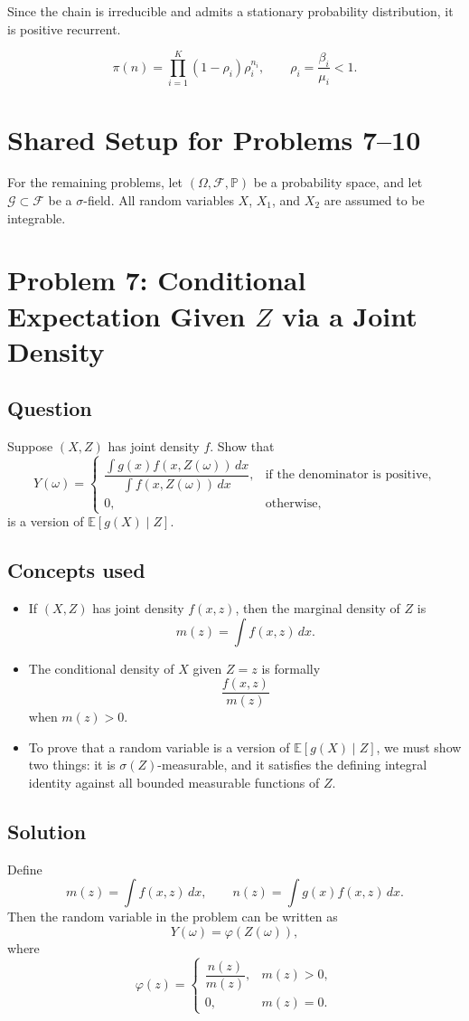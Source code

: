 \documentclass[11pt,a4paper]{article}
\newcommand{\E}{\mathbb{E}}
\newcommand{\1}{\mathbf{1}}
\begin{document}
Since the chain is irreducible and admits a stationary probability distribution, it is positive recurrent.

\[
\boxed{\pi(n)=\prod_{i=1}^K (1-\rho_i)\rho_i^{n_i},\qquad \rho_i=\frac{\beta_i}{\mu_i}<1.}
\]

\section*{Shared Setup for Problems 7--10}
For the remaining problems, let $(\Omega,\mathcal{F},\mathbb{P})$ be a probability space, and let $\mathcal{G}\subset \mathcal{F}$ be a $\sigma$-field. All random variables $X$, $X_1$, and $X_2$ are assumed to be integrable.

\section{Problem 7: Conditional Expectation Given \texorpdfstring{$Z$}{Z} via a Joint Density}
\subsection*{Question}
Suppose $(X,Z)$ has joint density $f$. Show that
\[
Y(\omega)=
\begin{cases}
\dfrac{\int g(x)f(x,Z(\omega))\,dx}{\int f(x,Z(\omega))\,dx}, & \text{if the denominator is positive},\\[2ex]
0, & \text{otherwise},
\end{cases}
\]
is a version of $\E[g(X)\mid Z]$.

\subsection*{Concepts used}
\begin{itemize}
  \item If $(X,Z)$ has joint density $f(x,z)$, then the marginal density of $Z$ is
  \[
  m(z)=\int f(x,z)\,dx.
  \]
  \item The conditional density of $X$ given $Z=z$ is formally
  \[
  \frac{f(x,z)}{m(z)}
  \]
  when $m(z)>0$.
  \item To prove that a random variable is a version of $\E[g(X)\mid Z]$, we must show two things:
  it is $\sigma(Z)$-measurable, and it satisfies the defining integral identity against all bounded measurable functions of $Z$.
\end{itemize}

\subsection*{Solution}
Define
\[
m(z)=\int f(x,z)\,dx,\qquad
n(z)=\int g(x)f(x,z)\,dx.
\]
Then the random variable in the problem can be written as
\[
Y(\omega)=\varphi(Z(\omega)),
\]
where
\[
\varphi(z)=
\begin{cases}
\dfrac{n(z)}{m(z)}, & m(z)>0,\\[1ex]
0, & m(z)=0.
\end{cases}
\]
\end{document}

